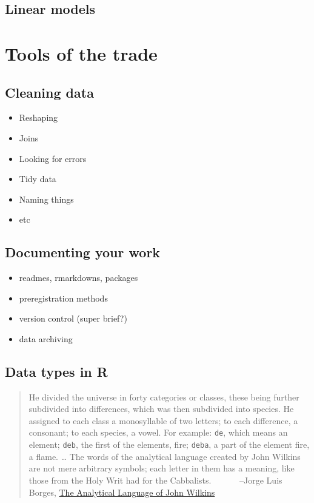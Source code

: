 \documentclass[]{book}
\providecommand{\tightlist}{%
  \setlength{\itemsep}{0pt}\setlength{\parskip}{0pt}}
\begin{document}
\hypertarget{linearmodels}{%
\chapter{Linear models}\label{linearmodels}}

\hypertarget{part-tools-of-the-trade}{%
\part{Tools of the trade}\label{part-tools-of-the-trade}}

\hypertarget{cleaning-data}{%
\chapter{Cleaning data}\label{cleaning-data}}

\begin{itemize}
\tightlist
\item
  Reshaping
\item
  Joins
\item
  Looking for errors
\item
  Tidy data
\item
  Naming things
\item
  etc
\end{itemize}

\hypertarget{documenting}{%
\chapter{Documenting your work}\label{documenting}}

\begin{itemize}
\tightlist
\item
  readmes, rmarkdowns, packages
\item
  preregistration methods
\item
  version control (super brief?)
\item
  data archiving
\end{itemize}

\hypertarget{appendix-appendices}{%
\appendix}


\hypertarget{data-types}{%
\chapter{Data types in R}\label{data-types}}

\begin{quote}
He divided the universe in forty categories or classes, these being further subdivided into differences, which was then subdivided into species. He assigned to each class a monosyllable of two letters; to each difference, a consonant; to each species, a vowel. For example: \texttt{de}, which means an element; \texttt{deb}, the first of the elements, fire; \texttt{deba}, a part of the element fire, a flame. \ldots{} The words of the analytical language created by John Wilkins are not mere arbitrary symbols; each letter in them has a meaning, like those from the Holy Writ had for the Cabbalists.
~~~~~~--Jorge Luis Borges, \href{https://en.wikipedia.org/wiki/The_Analytical_Language_of_John_Wilkins}{The Analytical Language of John Wilkins}
\end{quote}
\end{document}
